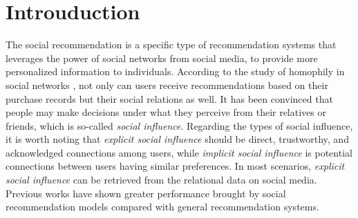\documentclass[letterpaper]{article} %
\begin{document}
\section{Introuduction}
The social recommendation is a specific type of recommendation systems that leverages the power of social networks from social media, to provide more personalized information to individuals. According to the study of homophily in social networks \cite{birds_of_feather, dual_graph}, not only can users receive recommendations based on their purchase records but their social relations as well. It has been convinced that people may make decisions under what they perceive from their relatives or friends, which is so-called \textit{social influence}. Regarding the types of social influence, it is worth noting that \textit{explicit social influence} should be direct, trustworthy, and acknowledged connections among users, while \textit{implicit social influence} is potential connections between users having similar preferences. In most scenarios, \textit{explicit social influence} can be retrieved from the relational data on social media. Previous works \cite{sorec, socialmf, trustsvd} have shown greater performance brought by social recommendation models compared with general recommendation systems.
\end{document}
